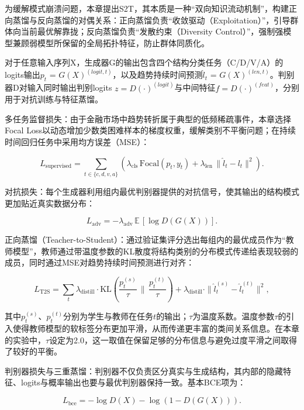 为缓解模式崩溃问题，本章提出S2T，其本质是一种``双向知识流动机制''，构建正向蒸馏与反向蒸馏的对偶关系：正向蒸馏负责``收敛驱动（Exploitation）''，引导群体向当前最优解靠拢；反向蒸馏负责``发散约束（Diversity Control）''，强制强模型兼顾弱模型所保留的全局拓扑特征，防止群体同质化。

对于任意输入序列X，生成器G的输出包含四个结构分类任务（C/D/V/A）的logits输出$p_t$ = $G(X)^{(logit,t)}$，以及趋势持续时间预测$\hat{l}_t$ = $G(X)^{(len,t)}$。判别器D对输入同时输出判别logits $z = D(\cdot)^{(logit)}$与中间特征$f = D(\cdot)^{(feat)}$，分别用于对抗训练与特征蒸馏。

多任务监督损失：由于金融市场中趋势转折属于典型的低频稀疏事件，本章选择Focal Loss以动态增加少数类困难样本的梯度权重，缓解类别不平衡问题；在持续时间回归任务中采用均方误差（MSE）：

\begin{equation}
L_{\text{supervised}}
=
\sum_{t\in\{c,d,v,a\}}
\left(
\lambda_{\text{cls}}\,
\mathrm{Focal}(p_t, y_t)
+
\lambda_{\text{len}}\,
\|\hat{l}_t - l_t\|^2
\right).
\end{equation}

对抗损失：每个生成器利用组内最优判别器提供的对抗信号，使其输出的结构模式更加贴近真实数据分布：

\begin{equation}
L_{\text{adv}}
=
-\lambda_{\text{adv}}\,\mathbb{E}\,[\log D(G(X))].
\end{equation}

正向蒸馏（Teacher-to-Student）：通过验证集评分选出每组内的最优成员作为``教师模型''，教师通过带温度参数的KL散度将结构类别的分布模式传递给表现较弱的成员，同时通过MSE对趋势持续时间预测进行对齐：

\begin{equation}
L_{\text{T2S}}
=
\sum_{t}
\lambda_{\text{distill}}
\cdot
\mathrm{KL}\!
\left(
\frac{p^{(s)}_t}{\tau}
\,\Big\|\,
\frac{p^{(t)}_t}{\tau}
\right)
+
\lambda_{\text{distill}}
\cdot
\|\hat{l}^{(s)}_t - \hat{l}^{(t)}_t\|^2,
\end{equation}

其中$p^{(s)}_t$、$p^{(t)}_t$分别为学生与教师在任务$t$的输出；$\tau$为温度系数。温度参数$\tau$的引入使得教师模型的软标签分布更加平滑，从而传递更丰富的类间关系信息。在本章的实验中，$\tau$设定为2.0，这一取值在保留足够的分布信息与避免过度平滑之间取得了较好的平衡。

判别器损失与三重蒸馏：判别器不仅负责区分真实与生成结构，其内部的隐藏特征、logits与概率输出也要与最优判别器保持一致。基本BCE项为：

\begin{equation}
L_{\text{bce}}
=
-\log D(X)
-
\log(1-D(G(X))).
\end{equation}

